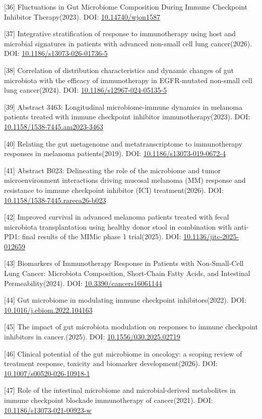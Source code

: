 {[}36{]} Fluctuations in Gut Microbiome Composition During Immune Checkpoint Inhibitor Therapy(2023). DOI: \url{10.14740/wjon1587}

{[}37{]} Integrative stratification of response to immunotherapy using host and microbial signatures in patients with advanced non-small cell lung cancer(2026). DOI: \url{10.1186/s13073-026-01736-5}

{[}38{]} Correlation of distribution characteristics and dynamic changes of gut microbiota with the efficacy of immunotherapy in EGFR-mutated non-small cell lung cancer(2024). DOI: \url{10.1186/s12967-024-05135-5}

{[}39{]} Abstract 3463: Longitudinal microbiome-immune dynamics in melanoma patients treated with immune checkpoint inhibitor immunotherapy(2023). DOI: \url{10.1158/1538-7445.am2023-3463}

{[}40{]} Relating the gut metagenome and metatranscriptome to immunotherapy responses in melanoma patients(2019). DOI: \url{10.1186/s13073-019-0672-4}

{[}41{]} Abstract B023: Delineating the role of the microbiome and tumor microenvironment interactions driving mucosal melanoma (MM) response and resistance to immune checkpoint inhibitor (ICI) treatment(2026). DOI: \url{10.1158/1538-7445.rareca26-b023}

{[}42{]} Improved survival in advanced melanoma patients treated with fecal microbiota transplantation using healthy donor stool in combination with anti-PD1: final results of the MIMic phase 1 trial(2025). DOI: \url{10.1136/jitc-2025-012659}

{[}43{]} Biomarkers of Immunotherapy Response in Patients with Non-Small-Cell Lung Cancer: Microbiota Composition, Short-Chain Fatty Acids, and Intestinal Permeability(2024). DOI: \url{10.3390/cancers16061144}

{[}44{]} Gut microbiome in modulating immune checkpoint inhibitors(2022). DOI: \url{10.1016/j.ebiom.2022.104163}

{[}45{]} The impact of gut microbiota modulation on responses to immune checkpoint inhibitors in cancer.(2025). DOI: \url{10.1556/030.2025.02719}

{[}46{]} Clinical potential of the gut microbiome in oncology: a scoping review of treatment response, toxicity and biomarker development(2026). DOI: \url{10.1007/s00520-026-10918-1}

{[}47{]} Role of the intestinal microbiome and microbial-derived metabolites in immune checkpoint blockade immunotherapy of cancer(2021). DOI: \url{10.1186/s13073-021-00923-w}


